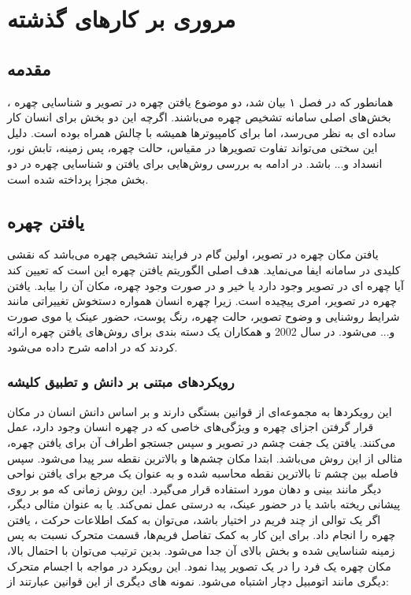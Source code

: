 \chapter{ مروری بر کارهای گذشته}

\section{مقدمه}
همانطور که در فصل ۱ بیان شد، دو موضوع یافتن چهره  در تصویر و شناسایی چهره ، بخش‌های اصلی سامانه تشخیص چهره می‌باشند. اگرچه این دو بخش برای انسان کار ساده ای به نظر می‌رسد، اما برای کامپیوتر‌ها همیشه با چالش همراه بوده است. دلیل این سختی می‌تواند تفاوت تصویرها در مقیاس، حالت چهره، پس زمینه، تابش نور، انسداد و... باشد. در ادامه به بررسی روش‌هایی برای یافتن و شناسایی چهره در دو بخش مجزا پرداخته شده است.
\section{یافتن چهره}
یافتن مکان چهره در تصویر، اولین گام در فرایند تشخیص چهره می‌باشد که نقشی کلیدی در سامانه ایفا می‌نماید. هدف اصلی الگوریتم‌ یافتن چهره این است که تعیین کند آیا چهره ای در تصویر وجود دارد یا خیر و در صورت وجود چهره، مکان آن را بیابد. یافتن چهره در تصویر، امری پیچیده است. زیرا چهره انسان همواره دستخوش تغییراتی مانند شرایط روشنایی و وضوح تصویر، حالت چهره، رنگ پوست، حضور عینک یا موی صورت و... می‌شود. در سال 2002  و همکاران \cite{982883} یک دسته بندی برای روش‌های یافتن چهره ارائه کردند که در ادامه شرح داده می‌شود.

\subsection{ رویکردهای مبتنی بر دانش و تطبیق کلیشه}
این رویکردها به مجموعه‌ای از قوانین بستگی دارند و بر اساس دانش انسان در مکان قرار گرفتن اجزای چهره و ویژگی‌های خاصی که در چهره انسان وجود دارد، عمل می‌کنند. یافتن یک جفت چشم در تصویر و سپس جستجو اطراف آن برای یافتن چهره، مثالی از این روش می‌باشد. ابتدا مکان چشم‌ها و بالاترین نقطه سر پیدا می‌شود. سپس فاصله بین چشم تا بالاترین نقطه محاسبه شده و به عنوان یک مرجع برای یافتن نواحی دیگر مانند بینی و دهان مورد استفاده قرار می‌گیرد. این روش زمانی که مو بر روی پیشانی ریخته باشد یا در حضور عینک، به درستی عمل نمی‌کند. یا به عنوان مثالی دیگر، اگر یک توالی از چند فریم در اختیار باشد، می‌توان به کمک اطلاعات حرکت ، یافتن چهره را انجام داد. برای این کار به کمک تفاصل فریم‌ها، قسمت متحرک نسبت به پس زمینه شناسایی شده و بخش بالای آن جدا می‌شود. بدین ترتیب می‌توان با احتمال بالا، مکان چهره یک فرد را در یک تصویر پیدا نمود. این رویکرد در مواجه با اجسام متحرک دیگری مانند اتومبیل دچار اشتباه می‌شود. نمونه های دیگری از این قوانین عبارتند از:

